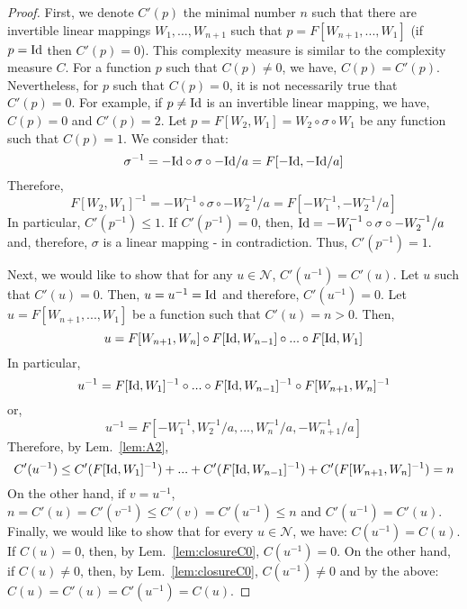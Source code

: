 \documentclass{article} %
\newcommand{\Id}{\textnormal{Id}}
\begin{document}
\begin{proof} First, we denote $C'(p)$ the minimal number $n$ such that there are invertible linear mappings $W_{1},...,W_{n+1}$ such that $p = F[W_{n+1},...,W_1]$ (if $p = \Id$ then $C'(p) = 0$). This complexity measure is similar to the complexity measure $C$. For a function $p$ such that $C(p)\neq 0$, we have, $C(p)=C'(p)$. Nevertheless, for $p$ such that $C(p)=0$, it is not necessarily true that $C'(p)=0$. For example, if $p\neq \Id$ is an invertible linear mapping, we have, $C(p)=0$ and $C'(p)=2$. Let $p = F[W_2,W_1] = W_2 \circ \sigma \circ W_1$ be any function such that $C(p)=1$. We consider that:
\begin{equation}
\sigma^{-1} = -\Id \circ \sigma \circ -\Id/a = F[-\Id,-\Id/a]
\end{equation}
Therefore, 
\begin{equation}
F[W_2,W_1]^{-1} = -W^{-1}_1 \circ \sigma \circ -W^{-1}_2/a = F[-W^{-1}_1,-W^{-1}_2/a]
\end{equation}
In particular, $C'(p^{-1}) \leq 1$. If $C'(p^{-1}) = 0$, then, $\Id = -W^{-1}_1 \circ \sigma \circ -W^{-1}_2/a$ and, therefore, $\sigma$ is a linear mapping - in contradiction. Thus, $C'(p^{-1}) = 1$.
 
Next, we would like to show that for any $u \in \mathcal{N}$, $C'(u^{-1}) = C'(u)$. Let $u$ such that $C'(u) = 0$. Then, $u = u^{-1} = \Id$ and therefore, $C'(u^{-1}) = 0$. Let $u = F[W_{n+1},...,W_1]$ be a function such that $C'(u)=n>0$. Then, 
\begin{equation}
u = F[W_{n+1},W_n] \circ F[\Id,W_{n-1}] \circ ... \circ F[\Id,W_1]
\end{equation}
In particular, 
\begin{equation}
u^{-1} = F[\Id,W_1]^{-1} \circ ... \circ  F[\Id,W_{n-1}]^{-1} \circ  F[W_{n+1},W_n]^{-1} 
\end{equation}
or,
\begin{equation}
u^{-1} = F[-W^{-1}_1,W^{-1}_2/a,...,W^{-1}_n/a,-W^{-1}_{n+1}/a]
\end{equation}
Therefore, by Lem.~\ref{lem:A2},
\begin{equation}
C'(u^{-1}) \leq  C'(F[\Id,W_1]^{-1}) +...+ C'(F[\Id,W_{n-1}]^{-1}) + C'(F[W_{n+1},W_n]^{-1}) = n 
\end{equation}
On the other hand, if $v = u^{-1}$, $n = C'(u) = C'(v^{-1}) \leq C'(v) = C'(u^{-1}) \leq n$ and $C'(u^{-1}) = C'(u)$. Finally, we would like to show that for every $u \in \mathcal{N}$, we have: $C(u^{-1})=C(u)$. If $C(u) = 0$, then, by Lem.~\ref{lem:closureC0}, $C(u^{-1}) = 0$. On the other hand, if $C(u)\neq 0$, then, by Lem.~\ref{lem:closureC0}, $C(u^{-1}) \neq 0$ and by the above: $C(u) = C'(u) = C'(u^{-1}) = C(u)$.
\end{proof}
\end{document}
